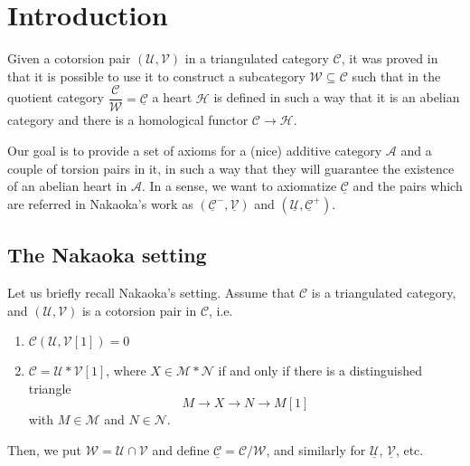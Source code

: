 \section{Introduction}

Given a cotorsion pair $(\mathcal{U},\mathcal{V})$ in a triangulated category $\mathcal{C}$,
it was proved in \cite{nakaoka2011general} that it is possible to use it to
construct a subcategory $\mathcal{W}\subseteq\mathcal{C}$ such that in the quotient category
$\dfrac{\mathcal{C}}{\mathcal{W}}=\underline{\mathcal{C}}$ a heart $\mathcal{H}$ is defined
in such a way that it is an abelian category and there is a homological functor $\mathcal{C}\to \mathcal{H}$.

Our goal is to provide a set of axioms for a (nice) additive category $\mathcal{A}$
and a couple of torsion pairs in it, in such a way that they will guarantee the existence
of an abelian heart in $\mathcal{A}$. In a sense, we want to axiomatize $\underline{\mathcal{C}}$ and
the pairs which are referred in Nakaoka's work as $(\underline{\mathcal{C}}^-,\underline{\mathcal{V}})$ and
$(\underline{\mathcal{U}},\underline{\mathcal{C}}^+)$.
\subsection*{The Nakaoka setting}


Let us briefly recall Nakaoka's setting. Assume that $\mathcal{C}$ is a triangulated category,
and $(\mathcal{U},\mathcal{V})$ is a cotorsion pair in $\mathcal{C}$, i.e.
\begin{enumerate}
  \item $\mathcal{C}(\mathcal{U},\mathcal{V}[1])=0$
  \item $\mathcal{C}=\mathcal{U}\ast \mathcal{V}[1]$, where $X\in \mathcal{M}\ast\mathcal{N}$ if and only if there
  is a distinguished triangle
  \begin{equation*}
    M\to X\to N \to M[1]
  \end{equation*}
  with $M\in \mathcal{M}$ and $N\in\mathcal{N}$.
\end{enumerate}

Then, we put $\mathcal{W}=\mathcal{U}\cap\mathcal{V}$ and define $\underline{\mathcal{C}}=\mathcal{C}/\mathcal{W}$,
and similarly for $\underline{\mathcal{U}}$, $\underline{\mathcal{V}}$, etc.

